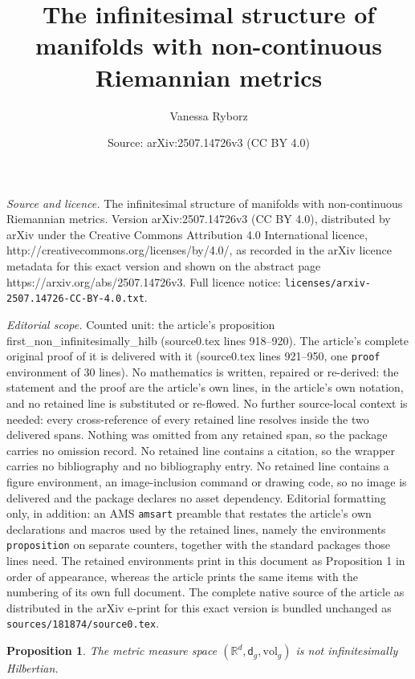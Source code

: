 \documentclass[10pt,a4paper]{amsart}
\title{The infinitesimal structure of manifolds with non-continuous Riemannian metrics}
\author{Vanessa Ryborz}
\date{Source: arXiv:2507.14726v3 (CC BY 4.0)}
\newtheorem{proposition}{Proposition}
\newcommand{\R}{\mathbb{R}}
\newcommand{\sfd}{\mathsf d}
\newcommand{\vol}{\mathrm{vol}}
\begin{document}
\maketitle

\noindent\emph{Source and licence.} The infinitesimal structure of manifolds with non-continuous Riemannian metrics. Version arXiv:2507.14726v3 (CC BY 4.0), distributed by arXiv under the Creative Commons Attribution 4.0 International licence, http://creativecommons.org/licenses/by/4.0/, as recorded in the arXiv licence metadata for this exact version and shown on the abstract page https://arxiv.org/abs/2507.14726v3. Full licence notice: \texttt{licenses/arxiv-2507.14726-CC-BY-4.0.txt}.\par\smallskip

\noindent\textit{Editorial scope.} Counted unit: the article's proposition first\_non\_infinitesimally\_hilb (source0.tex lines 918--920). The article's complete original proof of it is delivered with it (source0.tex lines 921--950, one \texttt{proof} environment of 30 lines). No mathematics is written, repaired or re-derived: the statement and the proof are the article's own lines, in the article's own notation, and no retained line is substituted or re-flowed.  No further source-local context is needed: every cross-reference of every retained line resolves inside the two delivered spans.  Nothing was omitted from any retained span, so the package carries no omission record.  No retained line contains a citation, so the wrapper carries no bibliography and no bibliography entry.  No retained line contains a figure environment, an image-inclusion command or drawing code, so no image is delivered and the package declares no asset dependency.  Editorial formatting only, in addition: an AMS \texttt{amsart} preamble that restates the article's own declarations and macros used by the retained lines, namely the environments \texttt{proposition} on separate counters, together with the standard packages those lines need.  The retained environments print in this document as Proposition 1 in order of appearance, whereas the article prints the same items with the numbering of its own full document.  The complete native source of the article as distributed in the arXiv e-print for this exact version is bundled unchanged as \texttt{sources/181874/source0.tex}.
\begin{proposition}\label{first_non_infinitesimally_hilb}
    The metric measure space $(\R^d, \sfd_g, \vol_g)$ is not infinitesimally Hilbertian. 
\end{proposition}
\end{document}
